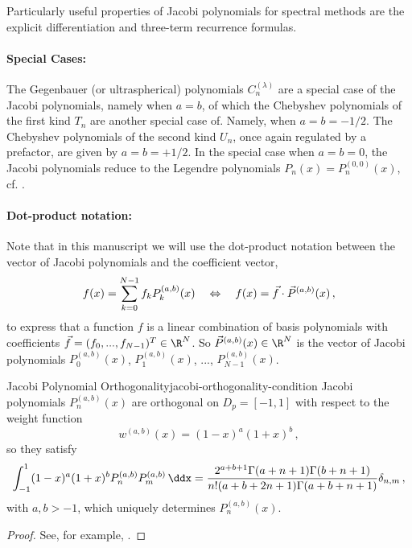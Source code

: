 Particularly useful properties of Jacobi polynomials for spectral methods are the explicit differentiation and three-term recurrence formulas.

\paragraph{Special Cases:}
The Gegenbauer (or ultraspherical) polynomials $C_n^{(\lambda)}$ are a special case of the Jacobi polynomials, namely when $a = b$,
of which the Chebyshev polynomials of the first kind $T_n$ are another special case of.
Namely, when $a = b = -1/2$.
The Chebyshev polynomials of the second kind $U_n$, once again regulated by a prefactor, are given by $a = b = +1/2$.
In the special case when $a = b = 0$, the Jacobi polynomials reduce to the Legendre polynomials $P_n(x) = P_n^{(0, 0)}(x)$, cf. \cite{2018-nist}.

\paragraph{Dot-product notation:}
Note that in this manuscript we will use the dot-product notation between the vector of Jacobi polynomials and the coefficient vector,
$$f(x) = \sum_{k=0}^{N-1} f_k P_k^{(a, b)}(x) \quad\Leftrightarrow\quad f(x) = \vec{f} \cdot \vec{P}^{(a, b)}(x)\,,$$
to express that a function $f$ is a linear combination of basis polynomials with coefficients $\vec{f} = (f_0, ..., f_{N-1})^T \in \R^N$.
So $\vec{P}^{(a, b)}(x) \in \R^N$ is the vector of Jacobi polynomials $P^{(a, b)}_0(x)$, $P^{(a, b)}_1(x)$, ..., $P^{(a, b)}_{N-1}(x)$.

\begin{theorem}{Jacobi Polynomial Orthogonality}{jacobi-orthogonality-condition}
  Jacobi polynomials $P_n^{(a,b)}(x)$ are orthogonal on $D_p = [-1,1]$ with respect to the weight function
  \begin{equation*}
    w^{(a,b)}(x)=(1-x)^a (1+x)^b\,,
  \end{equation*}
  so they satisfy
  \begin{align*}
    \int_{-1}^1(1-x)^a(1+x)^bP_n^{(a,b)}P_m^{(a,b)}\,\ddx = \frac{2^{a+b+1} \Gamma (a+n+1) \Gamma (b+n+1)}{n! (a+b+2 n+1) \Gamma (a+b+n+1)} \delta_{n,m}\,,
  \end{align*}
  with $a	,b>-1$, which uniquely determines $P_n^{(a,b)}(x)$.
\end{theorem}
\begin{proof}
  See, for example, \cite{1995-jacobi-orthogonality-proof}.
\end{proof}

